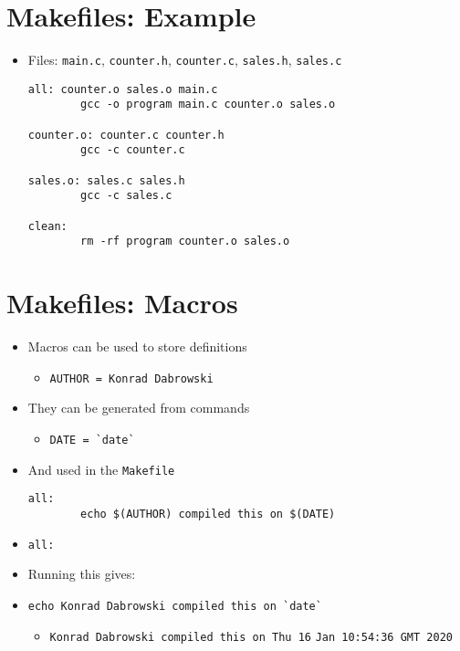 \documentclass{article}
\begin{document}
\section{Makefiles: Example}
\begin{itemize}
\item Files: \verb!main.c!, \verb!counter.h!, \verb!counter.c!, \verb!sales.h!, \verb!sales.c!

\begin{verbatim}
all: counter.o sales.o main.c
        gcc -o program main.c counter.o sales.o

counter.o: counter.c counter.h
        gcc -c counter.c

sales.o: sales.c sales.h
        gcc -c sales.c

clean:
        rm -rf program counter.o sales.o
\end{verbatim}
\end{itemize}



\section{Makefiles: Macros}
\begin{itemize}
\item Macros can be used to store definitions
\begin{itemize}
\item \verb!AUTHOR = Konrad Dabrowski!
\end{itemize}
\item They can be generated from commands
\begin{itemize}
\item \verb!DATE = `date`!
\end{itemize}
\item And used in the \verb!Makefile!
\begin{verbatim}
all:
        echo $(AUTHOR) compiled this on $(DATE)
\end{verbatim}
\item \verb!all:!
\item Running this gives:
\item \verb!echo Konrad Dabrowski compiled this on `date`!
\begin{itemize}
\item \verb!Konrad Dabrowski compiled this on Thu 16! \verb!Jan 10:54:36 GMT 2020!
\end{itemize}
\end{itemize}
\end{document}
